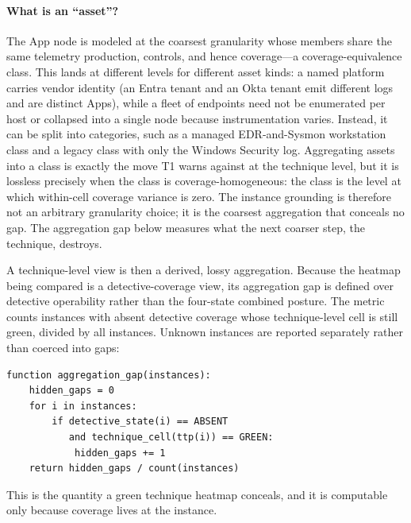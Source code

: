 \documentclass[10pt]{article}
\begin{document}
\paragraph{What is an ``asset''?} The App node is modeled at the coarsest granularity whose members share the same telemetry production, controls, and hence coverage---a coverage-equivalence class. This lands at different levels for different asset kinds: a named platform carries vendor identity (an Entra tenant and an Okta tenant emit different logs and are distinct Apps), while a fleet of endpoints need not be enumerated per host or collapsed into a single node because instrumentation varies. Instead, it can be split into categories, such as a managed EDR-and-Sysmon workstation class and a legacy class with only the Windows Security log. Aggregating assets into a class is exactly the move T1 warns against at the technique level, but it is lossless precisely when the class is coverage-homogeneous: the class is the level at which within-cell coverage variance is zero. The instance grounding is therefore not an arbitrary granularity choice; it is the coarsest aggregation that conceals no gap. The aggregation gap below measures what the next coarser step, the technique, destroys.

A technique-level view is then a derived, lossy aggregation. Because the heatmap being compared is a detective-coverage view, its aggregation gap is defined over detective operability rather than the four-state combined posture. The metric counts instances with absent detective coverage whose technique-level cell is still green, divided by all instances. Unknown instances are reported separately rather than coerced into gaps:
\begin{Verbatim}[fontsize=\small]
function aggregation_gap(instances):
    hidden_gaps = 0
    for i in instances:
        if detective_state(i) == ABSENT
           and technique_cell(ttp(i)) == GREEN:
            hidden_gaps += 1
    return hidden_gaps / count(instances)
\end{Verbatim}
This is the quantity a green technique heatmap conceals, and it is computable only because coverage lives at the instance.
\end{document}
